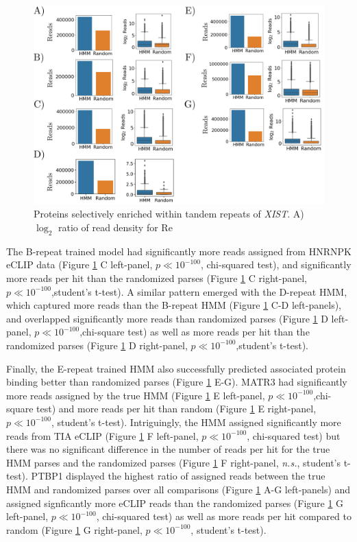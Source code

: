 \begin{figure}[h!]
\centering
\includegraphics[width=.95\textwidth]{images/transcriptomescan.pdf}
\caption{Proteins selectively enriched within tandem repeats of \emph{XIST}. A) $\log_2$ ratio of read density for Re}
\label{fig:transcriptome}
\end{figure}

The B-repeat trained model had significantly more reads assigned from HNRNPK eCLIP data (Figure \ref{fig:transcriptome} C left-panel, $p\ll10^{-100}$, chi-squared test), and significantly more reads per hit than the randomized parses (Figure \ref{fig:transcriptome} C right-panel, $p\ll10^{-100}$,student's t-test). A similar pattern emerged with the D-repeat HMM, which captured more reads than the B-repeat HMM (Figure \ref{fig:transcriptome} C-D left-panels), and overlapped significantly more reads than randomized parses (Figure \ref{fig:transcriptome} D left-panel, $p\ll10^{-100}$,chi-square test) as well as more reads per hit than the randomized parses (Figure \ref{fig:transcriptome} D right-panel, $p\ll10^{-100}$,student's t-test). 

Finally, the E-repeat trained HMM also successfully predicted associated protein binding better than randomized parses (Figure \ref{fig:transcriptome} E-G). MATR3 had significantly more reads assigned by the true HMM (Figure \ref{fig:transcriptome} E left-panel, $p\ll 10^{-100}$,chi-square test) and more reads per hit than random (Figure \ref{fig:transcriptome} E right-panel, $p\ll 10^{-100}$, student's t-test). Intriguingly, the HMM assigned significantly more reads from TIA eCLIP (Figure \ref{fig:transcriptome} F left-panel, $p\ll 10^{-100}$, chi-squared test) but there was no significant difference in the number of reads per hit for the true HMM parses and the randomized parses (Figure \ref{fig:transcriptome} F right-panel, \emph{n.s.}, student's t-test). PTBP1 displayed the highest ratio of assigned reads between the true HMM and randomized parses over all comparisons (Figure \ref{fig:transcriptome} A-G left-panels) and assigned signficantly more eCLIP reads than the randomized parses (Figure \ref{fig:transcriptome} G left-panel, $p\ll10^{-100}$, chi-squared test) as well as more reads per hit compared to random (Figure \ref{fig:transcriptome} G right-panel, $p\ll10^{-100}$, student's t-test). 

